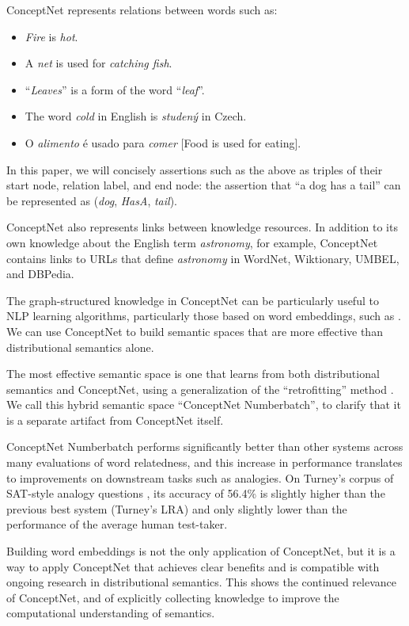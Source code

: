 \documentclass[letterpaper]{article}
\begin{document}
ConceptNet represents relations between words such as:

\begin{itemize}
    \item \emph{Fire} is \emph{hot}.
    \item A \emph{net} is used for \emph{catching fish}.
    \item ``\emph{Leaves}'' is a form of the word ``\emph{leaf}''.
    \item The word \emph{cold} in English is \emph{studený} in Czech.
    \item O \emph{alimento} é usado para \emph{comer} [Food is used for eating].
\end{itemize}

In this paper, we will concisely assertions such as the above as triples of
their start node, relation label, and end node: the assertion that ``a dog has
a tail'' can be represented as (\emph{dog}, \emph{HasA}, \emph{tail}).

ConceptNet also represents links between knowledge resources. In addition to
its own knowledge about the English term \emph{astronomy}, for example,
ConceptNet contains links to URLs that define \emph{astronomy} in WordNet,
Wiktionary, UMBEL, and DBPedia.

The graph-structured knowledge in ConceptNet can be particularly useful to NLP
learning algorithms, particularly those based on word embeddings, such as
\cite{mikolov2013word2vec}. We can use ConceptNet to build semantic spaces that
are more effective than distributional semantics alone.

The most effective semantic space is one that learns from both distributional
semantics and ConceptNet, using a generalization of the ``retrofitting'' method
\cite{faruqui2015retrofitting}. We call this hybrid semantic space ``ConceptNet
Numberbatch'', to clarify that it is a separate artifact from ConceptNet
itself.

ConceptNet Numberbatch performs significantly better than other systems across
many evaluations of word relatedness, and this increase in performance
translates to improvements on downstream tasks such as analogies.  On Turney's
corpus of SAT-style analogy questions \cite{turney2005lra}, its accuracy of
56.4\% is slightly higher than the previous best system (Turney's LRA) and only
slightly lower than the performance of the average human test-taker.

Building word embeddings is not the only application of ConceptNet, but it is a
way to apply ConceptNet that achieves clear benefits and is compatible with
ongoing research in distributional semantics. This shows the continued relevance of
ConceptNet, and of explicitly collecting knowledge to improve the computational
understanding of semantics.
\end{document}
